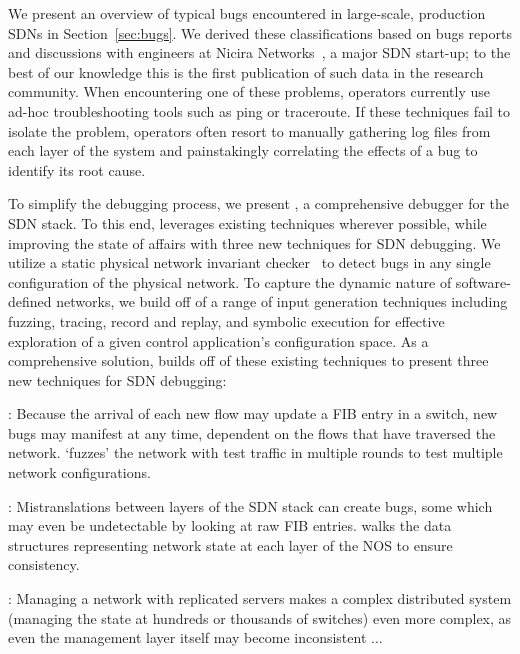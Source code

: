 

We present an overview of typical bugs encountered in large-scale, production SDNs in Section~\ref{sec:bugs}.
We derived these classifications based on bugs reports and discussions with engineers at Nicira Networks~\cite{nicira}, 
a major SDN start-up;
to the best of our knowledge this is the first publication of such data in the research community.
When encountering one of these problems,
operators currently use ad-hoc troubleshooting tools such as ping or traceroute.
If these techniques fail to isolate the problem, operators often resort to
manually gathering log files from each layer of the system and painstakingly
correlating the effects of a bug to identify its root cause.

To simplify the debugging process, we present \projectname{}, a comprehensive debugger for the SDN stack.
To this end, \projectname{} leverages existing techniques wherever possible, while improving the state of affairs
with three new techniques for SDN debugging. We utilize a static physical network invariant
checker~\cite{anteater} to detect bugs in any single configuration of the
physical network. To capture the dynamic nature of software-defined networks,
we build off of a range of input generation techniques including fuzzing, tracing, record and
replay, and symbolic execution for effective exploration of a given control
application's configuration space. 
As a comprehensive solution, \projectname{} builds off of these existing techniques to present
 three new techniques for SDN debugging:

:  Because the arrival of each new flow may update a FIB entry in a switch,
 new bugs may
manifest at any time, dependent on the flows that have traversed the network. \projectname{} `fuzzes' the network with 
test traffic in multiple rounds to test multiple network configurations.

: Mistranslations between layers of the SDN stack can create bugs, some which
may even be undetectable by looking at raw FIB entries. \projectname{} walks the data structures representing network state
at each layer of the NOS to ensure consistency.

: Managing a network with replicated servers makes a complex distributed system (managing the state at hundreds or thousands of switches) even more complex, as even the management layer itself may become inconsistent
\projectname{}...


